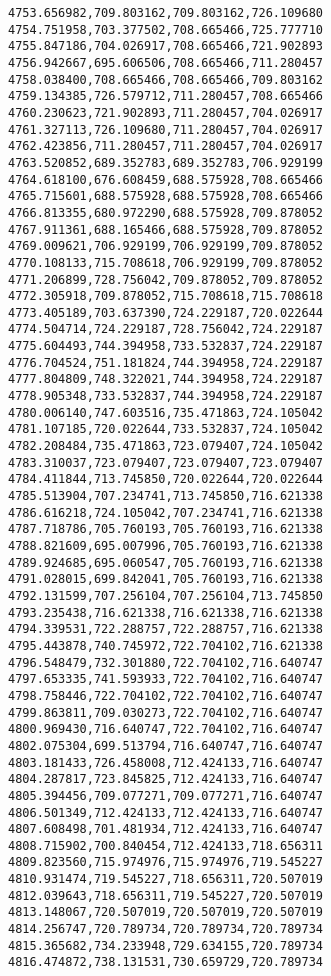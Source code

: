 \documentclass[11pt]{article}
\begin{document}
\begin{Verbatim}[commandchars=\\\{\}]
4753.656982,709.803162,709.803162,726.109680
4754.751958,703.377502,708.665466,725.777710
4755.847186,704.026917,708.665466,721.902893
4756.942667,695.606506,708.665466,711.280457
4758.038400,708.665466,708.665466,709.803162
4759.134385,726.579712,711.280457,708.665466
4760.230623,721.902893,711.280457,704.026917
4761.327113,726.109680,711.280457,704.026917
4762.423856,711.280457,711.280457,704.026917
4763.520852,689.352783,689.352783,706.929199
4764.618100,676.608459,688.575928,708.665466
4765.715601,688.575928,688.575928,708.665466
4766.813355,680.972290,688.575928,709.878052
4767.911361,688.165466,688.575928,709.878052
4769.009621,706.929199,706.929199,709.878052
4770.108133,715.708618,706.929199,709.878052
4771.206899,728.756042,709.878052,709.878052
4772.305918,709.878052,715.708618,715.708618
4773.405189,703.637390,724.229187,720.022644
4774.504714,724.229187,728.756042,724.229187
4775.604493,744.394958,733.532837,724.229187
4776.704524,751.181824,744.394958,724.229187
4777.804809,748.322021,744.394958,724.229187
4778.905348,733.532837,744.394958,724.229187
4780.006140,747.603516,735.471863,724.105042
4781.107185,720.022644,733.532837,724.105042
4782.208484,735.471863,723.079407,724.105042
4783.310037,723.079407,723.079407,723.079407
4784.411844,713.745850,720.022644,720.022644
4785.513904,707.234741,713.745850,716.621338
4786.616218,724.105042,707.234741,716.621338
4787.718786,705.760193,705.760193,716.621338
4788.821609,695.007996,705.760193,716.621338
4789.924685,695.060547,705.760193,716.621338
4791.028015,699.842041,705.760193,716.621338
4792.131599,707.256104,707.256104,713.745850
4793.235438,716.621338,716.621338,716.621338
4794.339531,722.288757,722.288757,716.621338
4795.443878,740.745972,722.704102,716.621338
4796.548479,732.301880,722.704102,716.640747
4797.653335,741.593933,722.704102,716.640747
4798.758446,722.704102,722.704102,716.640747
4799.863811,709.030273,722.704102,716.640747
4800.969430,716.640747,722.704102,716.640747
4802.075304,699.513794,716.640747,716.640747
4803.181433,726.458008,712.424133,716.640747
4804.287817,723.845825,712.424133,716.640747
4805.394456,709.077271,709.077271,716.640747
4806.501349,712.424133,712.424133,716.640747
4807.608498,701.481934,712.424133,716.640747
4808.715902,700.840454,712.424133,718.656311
4809.823560,715.974976,715.974976,719.545227
4810.931474,719.545227,718.656311,720.507019
4812.039643,718.656311,719.545227,720.507019
4813.148067,720.507019,720.507019,720.507019
4814.256747,720.789734,720.789734,720.789734
4815.365682,734.233948,729.634155,720.789734
4816.474872,738.131531,730.659729,720.789734

\end{Verbatim}
\end{document}
